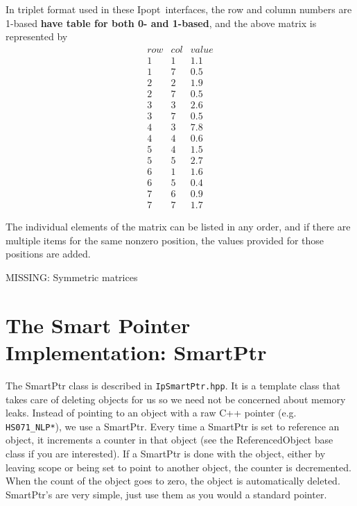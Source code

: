 \documentclass[letter,10pt]{article}
\newcommand{\Ipopt}{{\sc Ipopt}}
\begin{document}
In triplet format used in these \Ipopt\ interfaces, the row and column
numbers are 1-based {\bf have table for both 0- and 1-based}, and the
above matrix is represented by
\[
\begin{array}{ccc}
row     &       col     &       value \\
1       &       1       &       1.1     \\
1       &       7       &       0.5     \\
2       &       2       &       1.9     \\
2       &       7       &       0.5     \\
3       &       3       &       2.6     \\
3       &       7       &       0.5     \\
4       &       3       &       7.8     \\
4       &       4       &       0.6     \\
5       &       4       &       1.5     \\
5       &       5       &       2.7     \\
6       &       1       &       1.6     \\
6       &       5       &       0.4     \\
7       &       6       &       0.9     \\
7       &       7       &       1.7
\end{array}
\]

The individual elements of the matrix can be listed in any order, and
if there are multiple items for the same nonzero position, the values
provided for those positions are added.

MISSING: Symmetric matrices


\section{The Smart Pointer Implementation: SmartPtr} \label{app.smart_ptr}

The SmartPtr class is described in {\tt IpSmartPtr.hpp}. It is a
template class that takes care of deleting objects for us so we need
not be concerned about memory leaks. Instead of pointing to an object
with a raw C++ pointer (e.g. {\tt HS071\_NLP*}), we use a SmartPtr.
Every time a SmartPtr is set to reference an object, it increments a
counter in that object (see the ReferencedObject base class if you are
interested). If a SmartPtr is done with the object, either by leaving
scope or being set to point to another object, the counter is
decremented. When the count of the object goes to zero, the object is
automatically deleted. SmartPtr's are very simple, just use them as
you would a standard pointer.
\end{document}
